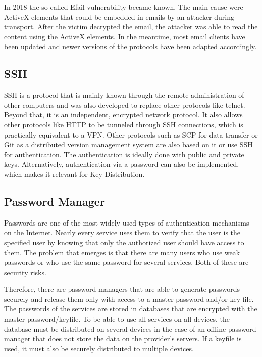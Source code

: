 \documentclass[12pt,oneside,a4paper,parskip]{scrbook}
\begin{document}
In 2018 the so-called Efail vulnerability became known. The main cause were ActiveX elements that could be embedded in emails by an attacker during transport. After the victim decrypted the email, the attacker was able to read the content using the ActiveX elements. In the meantime, most email clients have been updated and newer versions of the protocols have been adapted accordingly. \parencite{bsi_bsi_nodate}

\subsection{SSH}
SSH is a protocol that is mainly known through the remote administration of other computers and was also developed to replace other protocols like telnet.  Beyond that, it is an independent, encrypted network protocol. It also allows other protocols like HTTP to be tunneled through SSH connections, which is practically equivalent to a VPN. Other protocols such as SCP for data transfer or Git as a distributed version management system are also based on it or use SSH for authentication. The authentication is ideally done with public and private keys. Alternatively, authentication via a password can also be implemented, which makes it relevant for Key Distribution. \parencite{luber_ssh_2020}


\subsection{Password Manager}
Passwords are one of the most widely used types of authentication mechanisms on the Internet. Nearly every service uses them to verify that the user is the specified user by knowing that only the authorized user should have access to them. The problem that emerges is that there are many users who use weak passwords or who use the same password for several services. Both of these are security risks. \parencite{verizon_2019} 

Therefore, there are password managers that are able to generate passwords securely and release them only with access to a master password and/or key file. The passwords of the services are stored in databases that are encrypted with the master password/keyfile. To be able to use all services on all devices, the database must be distributed on several devices in the case of an offline password manager that does not store the data on the provider's servers. If a keyfile is used, it must also be securely distributed to multiple devices. \parencite{reichl_composite_nodate}
\end{document}
